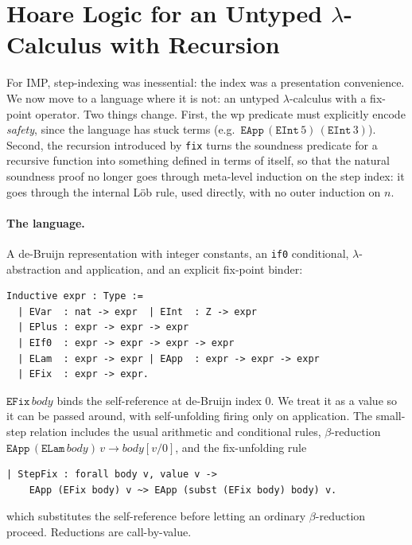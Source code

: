 \section{Hoare Logic for an Untyped $\lambda$-Calculus with Recursion}
\label{sec:lam}

For IMP, step-indexing was inessential: the index was a presentation
convenience.  We now move to a language where it is not: an untyped
$\lambda$-calculus with a fix-point operator.
Two things change.  First, the wp predicate must explicitly encode
\emph{safety}, since the language has stuck terms (e.g.\
$\mathtt{EApp}\, (\mathtt{EInt}\, 5)\, (\mathtt{EInt}\, 3)$).  Second,
the recursion introduced by \texttt{fix} turns the soundness predicate
for a recursive function into something defined in terms of itself,
so that the natural soundness proof no longer goes through meta-level
induction on the step index: it goes through the internal Löb
rule, used directly, with no outer induction on $n$.

\paragraph{The language.}
A de-Bruijn representation with integer constants, an \texttt{if0}
conditional, $\lambda$-abstraction and application, and an explicit
fix-point binder:
\begin{lstlisting}
Inductive expr : Type :=
  | EVar  : nat -> expr  | EInt  : Z -> expr
  | EPlus : expr -> expr -> expr
  | EIf0  : expr -> expr -> expr -> expr
  | ELam  : expr -> expr | EApp  : expr -> expr -> expr
  | EFix  : expr -> expr.
\end{lstlisting}
\noindent
$\mathtt{EFix}\, body$ binds the self-reference at de-Bruijn index
$0$. We treat it as a value so it can be passed around, with
self-unfolding firing only on application.  The small-step relation
includes the usual arithmetic and conditional rules, $\beta$-reduction
$\mathtt{EApp}\, (\mathtt{ELam}\, body)\, v \to body[v / 0]$, and the
fix-unfolding rule
\begin{lstlisting}
| StepFix : forall body v, value v ->
    EApp (EFix body) v ~> EApp (subst (EFix body) body) v.
\end{lstlisting}
\noindent
which substitutes the self-reference before letting an ordinary
$\beta$-reduction proceed.  Reductions are call-by-value.

